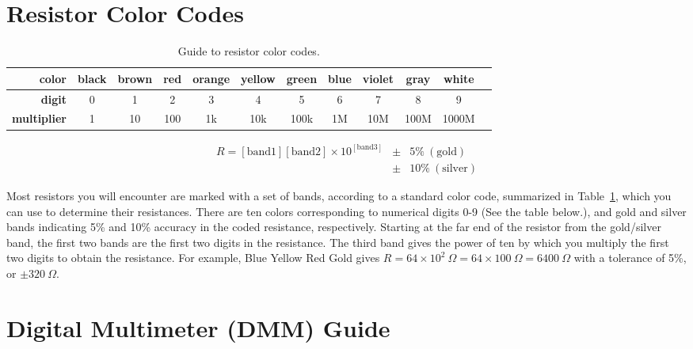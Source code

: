 \documentclass[11pt]{article}
\begin{document}
\section{Resistor Color Codes}

\begin{table}
\begin{center}
\begin{tabular}{|r|c|c|c|c|c|c|c|c|c|c|c|}\hline
\bf color      & \color{white}\cellcolor{Black}black & \color{white}\cellcolor{Brown}brown & \cellcolor{Red}red & \cellcolor{Orange}orange & \cellcolor{Yellow}yellow & \cellcolor{Green}green & \cellcolor{Blue}blue &
\cellcolor{Purple}violet & \cellcolor{Gray}gray & white \\\hline
\bf digit      & 0     & 1     & 2   & 3      & 4      & 5     & 6    &
7      & 8    & 9     \\\hline
\bf multiplier & 1     & 10    & 100 & 1k     & 10k    & 100k  & 1M   &
10M    & 100M & 1000M \\\hline
\end{tabular}
\begin{eqnarray*}
  R = [\mathrm{band 1}][\mathrm{band 2}] 
       \times 10^{[\mathrm{band 3}]} & \pm & 5\%~(\mathrm{gold})\\ 
                                 & \pm & 10\%~(\mathrm{silver})\nonumber
\end{eqnarray*}
\caption{\label{tab:rcolorcodes} Guide to resistor color codes.}
\end{center}
\end{table}

Most resistors you will encounter are marked with a set of bands,
according to a standard color code, summarized in
Table~\ref{tab:rcolorcodes}, which you can use to determine their
resistances. There are ten colors corresponding to numerical digits
0-9 (See the table below.), and gold and silver bands indicating 5\%
and 10\% accuracy in the coded resistance, respectively.  Starting at
the far end of the resistor from the gold/silver band, the first two
bands are the first two digits in the resistance.  The third band
gives the power of ten by which you multiply the first two digits to
obtain the resistance. For example, Blue Yellow Red Gold gives $R = 64
\times 10^{2}~\Omega = 64 \times 100~\Omega = 6400~\Omega$ with a
tolerance of 5\%, or $\pm 320~\Omega$.

\section{Digital Multimeter (DMM) Guide}
\label{sec:dmm}
\end{document}
